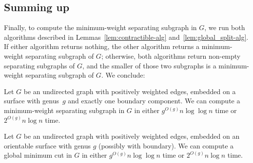 \documentclass[letterpaper,review]{siamart190516}
\begin{document}
{\subsection{Summing up}

Finally, to compute the minimum-weight separating subgraph in $G$, we run both  algorithms described in Lemmas~\ref{lem:contractible-alg} and~\ref{lem:global_split-alg}.  If either algorithm returns nothing, the other algorithm returns a minimum-weight separating subgraph of $G$; otherwise, both algorithms return non-empty separating subgraphs of $G$, and the smaller of those two subgraphs is a minimum-weight separating subgraph of $G$.  We conclude:

\begin{theorem}
Let $G$ be an undirected graph with positively weighted edges, embedded on a surface with genus~$g$ and exactly one boundary component.
We can compute a minimum-weight separating subgraph in $G$ in either $g^{O(g)} n \log \log n$ time or $2^{O(g)} n \log n$ time.
\end{theorem}

\begin{corollary}
Let $G$ be an undirected graph with positively weighted edges, embedded on an orientable surface with genus $g$ (possibly with boundary).
We can compute a global minimum cut in $G$ in either $g^{O(g)} n \log \log n$ time or $2^{O(g)} n \log n$ time.
\end{corollary}


%

}
\end{document}

